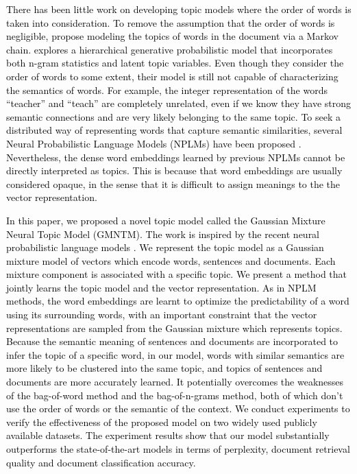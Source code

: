 \documentclass[english,letter]{article}
\renewcommand\[{\begin{equation}}
\renewcommand\]{\end{equation}}
\begin{document}
\textcolor{black}{There has been little work on developing topic models
where the order of words is taken into consideration. To remove the
assumption that the order of words is negligible, \citeauthor{gruber2007hidden} 
propose modeling the topics of words in the document via a Markov
chain. \citeauthor{wallach2006topic} 
explores a hierarchical generative probabilistic model that incorporates
both n-gram statistics and latent topic variables. Even though they
consider the order of words to some extent, their model is still not
capable of characterizing the semantics of words. For example, the
integer representation of the words ``teacher'' and ``teach''
are completely unrelated, even if we know they have strong semantic
connections and are very likely belonging to the same topic. To seek
a distributed way of representing words that capture semantic similarities,
several Neural Probabilistic Language Models (NPLMs) have been proposed
\cite{mnih2009scalable,mnih2012fast,mnih2013learning,mikolov2013efficient,le2014distributed}.
Nevertheless, the dense word embeddings learned by previous NPLMs
cannot be directly interpreted as topics. This is because that word
embeddings are usually considered opaque, in the sense that it is
difficult to assign meanings to the the vector representation.}

\textcolor{black}{In this paper, we proposed a novel topic model called
the Gaussian Mixture Neural Topic Model (GMNTM). The work is inspired
by the recent neural probabilistic language models \cite{mnih2009scalable,mnih2012fast,mnih2013learning,mikolov2013efficient,le2014distributed}.
We represent the topic model as a Gaussian mixture model of vectors
which encode words, sentences and documents. Each mixture component
is associated with a specific topic. We present a method that jointly
learns the topic model and the vector representation. As in NPLM methods,
the word embeddings are learnt to optimize the predictability of a
word using its surrounding words, with an important constraint that
the vector representations are sampled from the Gaussian mixture which
represents topics. Because the semantic meaning of sentences and documents
are incorporated to infer the topic of a specific word, in our model,
words with similar semantics are more likely to be clustered into
the same topic, and topics of sentences and documents are more accurately
learned. It potentially overcomes the weaknesses of the bag-of-word
method and the bag-of-n-grams method, both of which don't use the
order of words or the semantic of the context. We conduct experiments
to verify the effectiveness of the proposed model on two widely used
publicly available datasets. The experiment results show that our
model substantially outperforms the state-of-the-art models in terms
of perplexity, document retrieval quality and document classification
accuracy.}
\end{document}

